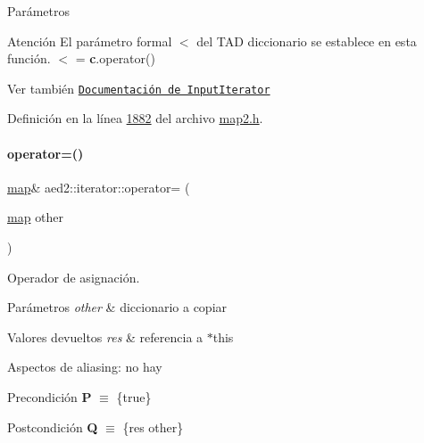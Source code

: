 \begin{DoxyParams}{\-Parámetros}
\begin{DoxyAttention}{Atención}
El parámetro formal $<$ del T\+AD diccionario se establece en esta función. $<$ = {\bfseries c}.operator()
\end{DoxyAttention}
\begin{DoxySeeAlso}{Ver también}
\href{http://en.cppreference.com/w/cpp/concept/InputIterator}{\tt Documentación de Input\+Iterator} 
\end{DoxySeeAlso}


Definición en la línea \hyperlink{map2_8h_source_l01882}{1882} del archivo \hyperlink{map2_8h_source}{map2.\+h}.

\mbox{\label{classaed2_1_1iterator_a7cafd02350b04f7546fa29c17168c18b_a7cafd02350b04f7546fa29c17168c18b}} 
\paragraph{\texorpdfstring{operator=()}{operator=()}}
{\footnotesize\ttfamily \hyperlink{classaed2_1_1map}{map}\& aed2\+::iterator\+::operator= (\begin{DoxyParamCaption}\item[{\hyperlink{classaed2_1_1map}{map}}]{other }\end{DoxyParamCaption})\hspace{0.3cm}{\ttfamily [inline]}}



Operador de asignación. 


\begin{DoxyParams}{Parámetros}
{\em other} & diccionario a copiar \\
\hline
\end{DoxyParams}

\begin{DoxyRetVals}{Valores devueltos}
{\em res} & referencia a $\ast$this\\
\hline
\end{DoxyRetVals}
\begin{DoxyParagraph}{Aspectos de aliasing\+:}
no hay
\end{DoxyParagraph}
\begin{DoxyPrecond}{Precondición}
{\bfseries P} $\equiv$ \{true\} 
\end{DoxyPrecond}
\begin{DoxyPostcond}{Postcondición}
{\bfseries Q} $\equiv$ \{res  other\}
\end{DoxyPostcond}


\end{DoxyParams}
